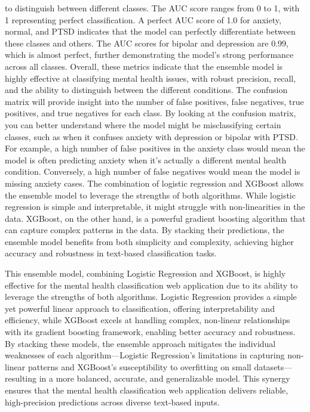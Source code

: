 \noindent
to distinguish between different classes. The AUC score ranges from 0 to 1, with 1 representing perfect classification. A perfect AUC score of 1.0 for anxiety, normal, and PTSD indicates that the model can perfectly differentiate between these classes and others. The AUC scores for bipolar and depression are 0.99, which is almost perfect, further demonstrating the model's strong performance across all classes. Overall, these metrics indicate that the ensemble model is highly effective at classifying mental health issues, with robust precision, recall, and the ability to distinguish between the different conditions. The confusion matrix will provide insight into the number of false positives, false negatives, true positives, and true negatives for each class. By looking at the confusion matrix, you can better understand where the model might be misclassifying certain classes, such as when it confuses anxiety with depression or bipolar with PTSD. For example, a high number of false positives in the anxiety class would mean the model is often predicting anxiety when it's actually a different mental health condition. Conversely, a high number of false negatives would mean the model is missing anxiety cases. The combination of logistic regression and XGBoost allows the ensemble model to leverage the strengths of both algorithms. While logistic regression is simple and interpretable, it might struggle with non-linearities in the data. XGBoost, on the other hand, is a powerful gradient boosting algorithm that can capture complex patterns in the data. By stacking their predictions, the ensemble model benefits from both simplicity and complexity, achieving higher accuracy and robustness in text-based classification tasks.

\vspace{1em}

\noindent
This ensemble model, combining Logistic Regression and XGBoost, is highly effective for the mental health classification web application due to its ability to leverage the strengths of both algorithms. Logistic Regression provides a simple yet powerful linear approach to classification, offering interpretability and efficiency, while XGBoost excels at handling complex, non-linear relationships with its gradient boosting framework, enabling better accuracy and robustness. By stacking these models, the ensemble approach mitigates the individual weaknesses of each algorithm—Logistic Regression's limitations in capturing non-linear patterns and XGBoost's susceptibility to overfitting on small datasets—resulting in a more balanced, accurate, and generalizable model. This synergy ensures that the mental health classification web application delivers reliable, high-precision predictions across diverse text-based inputs.

